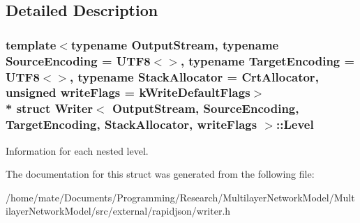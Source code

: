 \subsection{Detailed Description}
\subsubsection*{template$<$typename Output\+Stream, typename Source\+Encoding = U\+T\+F8$<$$>$, typename Target\+Encoding = U\+T\+F8$<$$>$, typename Stack\+Allocator = Crt\+Allocator, unsigned write\+Flags = k\+Write\+Default\+Flags$>$\\*
struct Writer$<$ Output\+Stream, Source\+Encoding, Target\+Encoding, Stack\+Allocator, write\+Flags $>$\+::\+Level}

Information for each nested level. 

The documentation for this struct was generated from the following file\+:\begin{DoxyCompactItemize}
\item 
/home/mate/\+Documents/\+Programming/\+Research/\+Multilayer\+Network\+Model/\+Multilayer\+Network\+Model/src/external/rapidjson/writer.\+h\end{DoxyCompactItemize}
